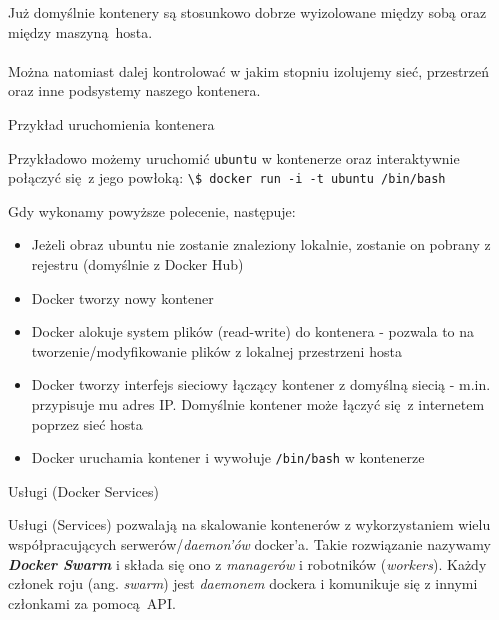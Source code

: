 \documentclass[aspectratio=169]{beamer}
\begin{document}
\begin{frame}
    \begin{card}
        Już domyślnie kontenery są stosunkowo dobrze wyizolowane między sobą oraz między maszyną hosta.\\\\
        Można natomiast dalej kontrolować w jakim stopniu izolujemy sieć, przestrzeń oraz inne podsystemy naszego kontenera.
    \end{card}
\end{frame}

\begin{frame}{Przykład uruchomienia kontenera}
    \begin{cardTiny}
        Przykładowo możemy uruchomić \colorbox{dark-gray}{\lstinline{ubuntu}} w kontenerze oraz interaktywnie połączyć się z jego powłoką: \colorbox{dark-gray}{\lstinline{\$ docker run -i -t ubuntu /bin/bash}}
    \end{cardTiny}

    \begin{cardTiny}
        Gdy wykonamy powyższe polecenie, następuje:
        \begin{itemize}
            \item Jeżeli obraz ubuntu nie zostanie znaleziony lokalnie, zostanie on pobrany z rejestru (domyślnie z Docker Hub)
            \item Docker tworzy nowy kontener
            \item Docker alokuje system plików (read-write) do kontenera - pozwala to na tworzenie/modyfikowanie plików z lokalnej przestrzeni hosta
            \item Docker tworzy interfejs sieciowy łączący kontener z domyślną siecią - m.in. przypisuje mu adres IP. Domyślnie kontener może łączyć się z internetem poprzez sieć hosta
            \item Docker uruchamia kontener i wywołuje \colorbox{dark-gray}{\lstinline{/bin/bash}} w kontenerze
        \end{itemize}
    \end{cardTiny}
\end{frame}

\begin{frame}{Usługi (Docker Services)}
    \begin{card}
        Usługi (Services) pozwalają na skalowanie kontenerów z wykorzystaniem wielu współpracujących serwerów/\textit{daemon'ów} docker'a.
        Takie rozwiązanie nazywamy \textbf{\textit{Docker Swarm}} i składa się ono z \textit{managerów} i robotników (\textit{workers}). 
        Każdy członek roju (ang. \textit{swarm}) jest \textit{daemonem} dockera i komunikuje się z innymi członkami za pomocą API.
    \end{card}
\end{frame}
\end{document}
